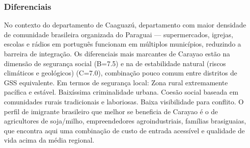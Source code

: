 \subsubsection*{Diferenciais}\label{dif-carayao-0503}
No contexto do departamento de Caaguazú, departamento com maior densidade de comunidade brasileira organizada do Paraguai — supermercados, igrejas, escolas e rádios em português funcionam em múltiplos municípios, reduzindo a barreira de integração. Os diferenciais mais marcantes de Carayao estão na dimensão de segurança social (B=7.5) e na de estabilidade natural (riscos climáticos e geológicos) (C=7.0), combinação pouco comum entre distritos de GSS equivalente. Em termos de segurança local: Zona rural extremamente pacífica e estável. Baixíssima criminalidade urbana. Coesão social baseada em comunidades rurais tradicionais e laboriosas. Baixa visibilidade para conflito. O perfil de imigrante brasileiro que melhor se beneficia de Carayao é o de agricultores de soja/milho, empreendedores agroindustriais, famílias brasiguaias, que encontra aqui uma combinação de custo de entrada acessível e qualidade de vida acima da média regional.
